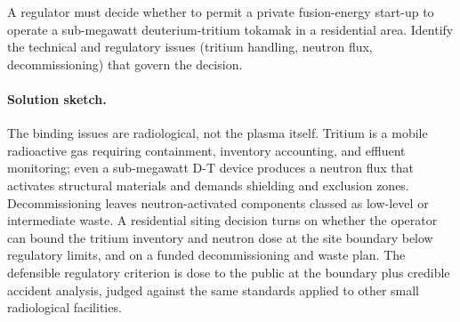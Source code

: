 \begin{exercise}
A regulator must decide whether to permit a private fusion-energy
start-up to operate a sub-megawatt deuterium-tritium tokamak in a
residential area. Identify the technical and regulatory issues
(tritium handling, neutron flux, decommissioning) that govern the
decision.
\paragraph{Solution sketch.} The binding issues are radiological, not the
plasma itself. Tritium is a mobile radioactive gas requiring containment,
inventory accounting, and effluent monitoring; even a sub-megawatt D-T
device produces a neutron flux that activates structural materials and
demands shielding and exclusion zones. Decommissioning leaves
neutron-activated components classed as low-level or intermediate waste.
A residential siting decision turns on whether the operator can bound the
tritium inventory and neutron dose at the site boundary below regulatory
limits, and on a funded decommissioning and waste plan. The defensible
regulatory criterion is dose to the public at the boundary plus credible
accident analysis, judged against the same standards applied to other
small radiological facilities.
\end{exercise}
